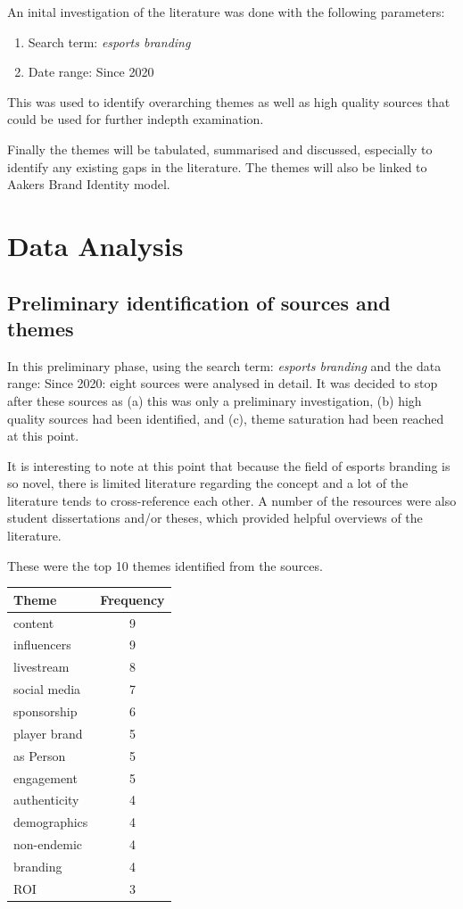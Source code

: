 \documentclass[10pt,twoside]{article}
\begin{document}
An inital investigation of the literature was done with the following parameters:
\begin{enumerate}
	\item Search term: \emph{esports branding}
	\item Date range: Since 2020
\end{enumerate}

This was used to identify overarching themes as well as high quality sources that could be used for further indepth examination.

Finally the themes will be tabulated, summarised and discussed, especially to identify any existing gaps in the literature. The themes will also be linked to Aakers Brand Identity model.

\section{Data Analysis}

\subsection{Preliminary identification of sources and themes}

In this preliminary phase, using the search term: \emph{esports branding} and the data range: Since 2020: eight sources were analysed in detail. It was decided to stop after these sources as (a) this was only a preliminary investigation, (b) high quality sources had been identified, and (c), theme saturation had been reached at this point.

It is interesting to note at this point that because the field of esports branding is so novel, there is limited literature regarding the concept and a lot of the literature tends to cross-reference each other. A number of the resources were also student dissertations and/or theses, which provided helpful overviews of the literature.

These were the top 10 themes identified from the sources.

\begin{center}
	\begin{tabular}{|l|c|}
		\hline	
		Theme & Frequency \\
		\hline
		content & 9 \\
		influencers & 9 \\
		livestream & 8 \\
		social media & 7 \\
		sponsorship & 6 \\
		player brand & 5 \\
		as Person & 5 \\
		engagement & 5 \\
		authenticity & 4 \\
		demographics & 4 \\
		non-endemic & 4 \\
		branding & 4 \\
		ROI & 3 \\
		\hline
	\end{tabular}
\end{center}
\end{document}
